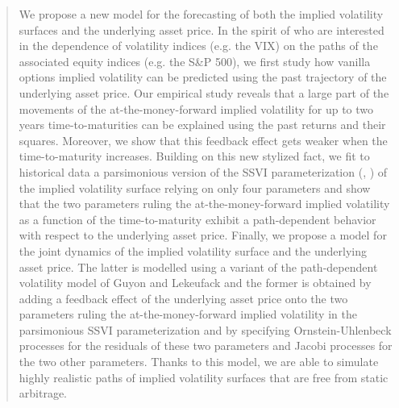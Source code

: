 \begin{abstract}
    We propose a new model for the forecasting of both the implied volatility surfaces and the underlying asset price.
    In the spirit of \cite{guyon2022volatility} who are interested in the dependence of volatility indices (e.g. the VIX) on the paths of the associated equity indices (e.g. the S\&P 500), we first study how vanilla options implied volatility can be predicted using the past trajectory of the underlying asset price. Our empirical study reveals that a large part of the movements of the at-the-money-forward implied volatility for up to two years time-to-maturities can be explained using the past returns and their squares. Moreover, we show that this feedback effect gets weaker when the time-to-maturity increases. Building on this new stylized fact, we fit to historical data a parsimonious version of the SSVI parameterization (\citeauthor{gatheral2014arbitrage}, \citeyear{gatheral2014arbitrage}) of the implied volatility surface relying on only four parameters and show that the two parameters ruling the at-the-money-forward implied volatility as a function of the time-to-maturity exhibit a path-dependent behavior with respect to the underlying asset price. Finally, we propose a model for the joint dynamics of the implied volatility surface and the underlying asset price. The latter is modelled using a variant of the path-dependent volatility model of Guyon and Lekeufack and the former is obtained by adding a feedback effect of the underlying asset price onto the two parameters ruling the at-the-money-forward implied volatility in the parsimonious SSVI parameterization and by specifying Ornstein-Uhlenbeck processes for the residuals of these two parameters and Jacobi processes for the two other parameters. Thanks to this model, we are able to simulate highly realistic paths of implied volatility surfaces that are free from static arbitrage.
\end{abstract}

